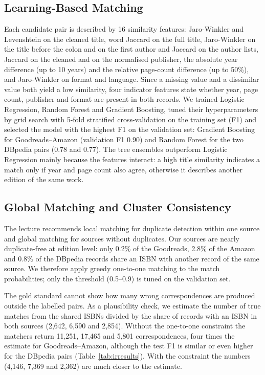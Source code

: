 \documentclass[runningheads]{llncs}
\begin{document}
\subsection{Learning-Based Matching}\label{sec:ml}
Each candidate pair is described by 16 similarity features: Jaro-Winkler and
Levenshtein on the cleaned title, word Jaccard on the full title, Jaro-Winkler
on the title before the colon and on the first author and Jaccard on the author lists,
Jaccard on the cleaned and on the normalised publisher, the absolute year
difference (up to 10 years) and the relative page-count difference (up to
50\%), and Jaro-Winkler on format and language. Since a missing value and a
dissimilar value both yield a low similarity, four indicator features state
whether year, page count, publisher and format are present in both records.
We trained Logistic Regression, Random Forest and Gradient Boosting, tuned their
hyperparameters by grid search with 5-fold stratified cross-validation on the
training set (F1) and selected the model with the highest F1 on the validation
set: Gradient Boosting for Goodreads--Amazon (validation F1 0.90) and Random
Forest for the two DBpedia pairs (0.78 and 0.77). The tree ensembles outperform
Logistic Regression mainly because the features interact: a high title
similarity indicates a match only if year and page count also agree, otherwise
it describes another edition of the same work.

\subsection{Global Matching and Cluster Consistency}\label{sec:global}
The lecture recommends local matching for duplicate detection within one source
and global matching for sources without duplicates. Our sources are nearly
duplicate-free at edition level: only 0.2\% of the Goodreads, 2.8\% of the
Amazon and 0.8\% of the DBpedia records share an ISBN with another record of
the same source. We therefore apply greedy one-to-one matching to the match
probabilities; only the threshold (0.5--0.9) is tuned on the validation set.

The gold standard cannot show how many wrong correspondences are produced
outside the labelled pairs. As a plausibility check, we estimate the number of
true matches from the shared ISBNs divided by the share of records with an ISBN
in both sources (2,642, 6,590 and 2,854). Without the one-to-one constraint the
matchers return 11,251, 17,465 and 5,801 correspondences, four times the
estimate for Goodreads--Amazon, although the test F1 is similar or even higher
for the DBpedia pairs (Table~\ref{tab:irresults}). With the constraint the
numbers (4,146, 7,369 and 2,362) are much closer to the estimate.
\end{document}
